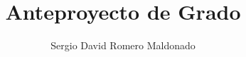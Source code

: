 \documentclass[a4paper,12pt,twoside]{report}
\begin{document}
\title{\LARGE {\bf Anteproyecto de Grado}\\
 \vspace*{6mm}
}

\author{Sergio David Romero Maldonado}

\normallinespacing
\maketitle

\preface





\body






\appendix




\end{document}
